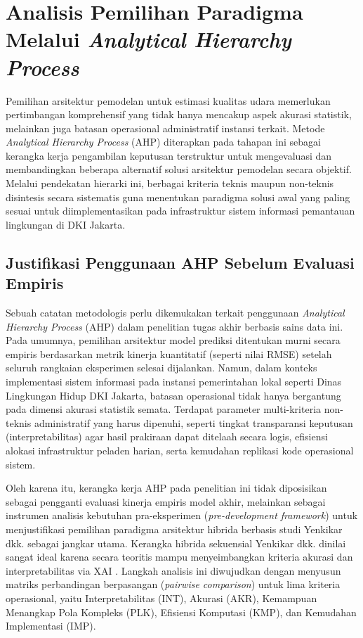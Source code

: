 \section{Analisis Pemilihan Paradigma Melalui \textit{Analytical Hierarchy Process}}

Pemilihan arsitektur pemodelan untuk estimasi kualitas udara memerlukan pertimbangan komprehensif yang tidak hanya mencakup aspek akurasi statistik, melainkan juga batasan operasional administratif instansi terkait. Metode \textit{Analytical Hierarchy Process} (AHP) diterapkan pada tahapan ini sebagai kerangka kerja pengambilan keputusan terstruktur untuk mengevaluasi dan membandingkan beberapa alternatif solusi arsitektur pemodelan secara objektif. Melalui pendekatan hierarki ini, berbagai kriteria teknis maupun non-teknis disintesis secara sistematis guna menentukan paradigma solusi awal yang paling sesuai untuk diimplementasikan pada infrastruktur sistem informasi pemantauan lingkungan di DKI Jakarta.

\subsection{Justifikasi Penggunaan AHP Sebelum Evaluasi Empiris}

Sebuah catatan metodologis perlu dikemukakan terkait penggunaan \textit{Analytical Hierarchy Process} (AHP) dalam penelitian tugas akhir berbasis sains data ini. Pada umumnya, pemilihan arsitektur model prediksi ditentukan murni secara empiris berdasarkan metrik kinerja kuantitatif (seperti nilai RMSE) setelah seluruh rangkaian eksperimen selesai dijalankan. Namun, dalam konteks implementasi sistem informasi pada instansi pemerintahan lokal seperti Dinas Lingkungan Hidup DKI Jakarta, batasan operasional tidak hanya bergantung pada dimensi akurasi statistik semata. Terdapat parameter multi-kriteria non-teknis administratif yang harus dipenuhi, seperti tingkat transparansi keputusan (interpretabilitas) agar hasil prakiraan dapat ditelaah secara logis, efisiensi alokasi infrastruktur peladen harian, serta kemudahan replikasi kode operasional sistem.

Oleh karena itu, kerangka kerja AHP pada penelitian ini tidak diposisikan sebagai pengganti evaluasi kinerja empiris model akhir, melainkan sebagai instrumen analisis kebutuhan pra-eksperimen (\textit{pre-development framework}) untuk menjustifikasi pemilihan paradigma arsitektur hibrida berbasis studi Yenkikar dkk. \autocite{yenkikar2025explainable} sebagai jangkar utama. Kerangka hibrida sekuensial Yenkikar dkk. dinilai sangat ideal karena secara teoritis mampu menyeimbangkan kriteria akurasi dan interpretabilitas via XAI \autocite{yenkikar2025explainable}. Langkah analisis ini diwujudkan dengan menyusun matriks perbandingan berpasangan (\textit{pairwise comparison}) untuk lima kriteria operasional, yaitu Interpretabilitas (INT), Akurasi (AKR), Kemampuan Menangkap Pola Kompleks (PLK), Efisiensi Komputasi (KMP), dan Kemudahan Implementasi (IMP).


